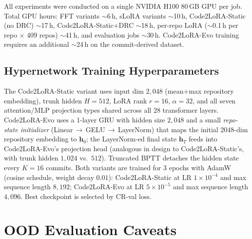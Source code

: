 \documentclass[11pt]{article}
\newcommand{\codelora}{Code2LoRA\xspace}
\newcommand{\codelorastatic}{\codelora-Static\xspace}
\newcommand{\codeloraevo}{\codelora-Evo\xspace}
\begin{document}
All experiments were conducted on a single NVIDIA H100 80\,GB GPU per job.
Total GPU hours: FFT variants $\sim$6\,h, sLoRA variants $\sim$10\,h, \codelorastatic{} (no DRC) $\sim$17\,h, \codelorastatic{}+DRC $\sim$18\,h, per-repo LoRA ($\sim$0.1\,h per repo $\times$ 409 repos) $\sim$41\,h, and evaluation jobs $\sim$30\,h.
\codeloraevo{} training requires an additional $\sim$24\,h on the commit-derived dataset.

\subsection{Hypernetwork Training Hyperparameters}
\label{app:hyperparams_full}

The \codelorastatic{} variant uses input dim $2{,}048$ (mean$+$max repository embedding), trunk hidden $H{=}512$, LoRA rank $r{=}16$, $\alpha{=}32$, and all seven attention/MLP projection types shared across all $28$ transformer layers.
\codeloraevo{} uses a 1-layer GRU with hidden size $2{,}048$ and a small \emph{repo-state initializer} (Linear\,$\to$\,GELU\,$\to$\,LayerNorm) that maps the initial 2048-dim repository embedding to $\mathbf{h}_0$; the LayerNorm-ed final state $\mathbf{h}_T$ feeds into \codeloraevo{}'s projection head (analogous in design to \codelorastatic{}'s, with trunk hidden $1{,}024$ vs.\ $512$).
Truncated BPTT detaches the hidden state every $K{=}16$ commits.
Both variants are trained for $3$ epochs with AdamW (cosine schedule, weight decay $0.01$): \codelorastatic{} at LR $1{\times}10^{-4}$ and max sequence length $8{,}192$; \codeloraevo{} at LR $5{\times}10^{-5}$ and max sequence length $4{,}096$.
Best checkpoint is selected by CR-val loss.



\section{OOD Evaluation Caveats}
\label{app:ood_caveats_top}
\label{app:ood_caveats}
\end{document}
